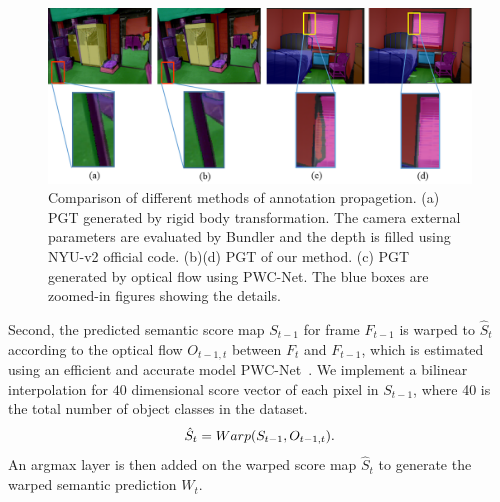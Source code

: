 \begin{figure}[t]
	\centering
	\includegraphics[width=\columnwidth]{figure/PGT_compared.png}
	\caption{Comparison of different methods of annotation propagetion. (a) PGT generated by rigid body transformation. The camera external parameters are evaluated by Bundler and the depth is filled using NYU-v2 official code. (b)(d) PGT of our method. (c) PGT generated by optical flow using PWC-Net\cite{Sun2018}. The blue boxes are zoomed-in figures showing the details.}
	\label{fig:PGT_Com}
	
\end{figure}
Second, the predicted semantic score map $S_{t-1}$ for frame $F_{t-1}$ is warped to $\hat{S}_{t}$ according to the optical flow $O_{t-1,t}$ between $F_t$ and $F_{t-1}$, which is estimated using an efficient and accurate model PWC-Net~\cite{Sun2018}. 
We implement a bilinear interpolation for $40$ dimensional score vector of each pixel in $S_{t-1}$, where 40 is the total number of object classes in the dataset. 
\begin{equation}
\centering
\hat{S}_{t}=Warp(S_{t-1},O_{t-1,t}).
\end{equation}
%
An argmax layer is then added on the warped score map ${\hat{S}_{t}}$ to generate the warped semantic prediction $W_{t}$.


